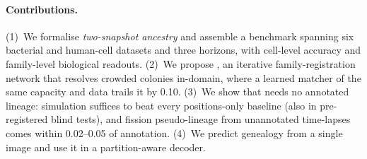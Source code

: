 \paragraph{Contributions.}
(1)~We formalise \emph{two-snapshot ancestry} and assemble a benchmark spanning six bacterial and human-cell datasets and three horizons, with cell-level accuracy and family-level biological readouts.
(2)~We propose \ours, an iterative family-registration network that resolves crowded colonies in-domain, where a learned matcher of the same capacity and data trails it by 0.10.
(3)~We show that \ours needs no annotated lineage: simulation suffices to beat every positions-only baseline (also in pre-registered blind tests), and fission pseudo-lineage from unannotated time-lapses comes within 0.02--0.05 of annotation.
(4)~We predict genealogy from a single image and use it in a partition-aware decoder.

